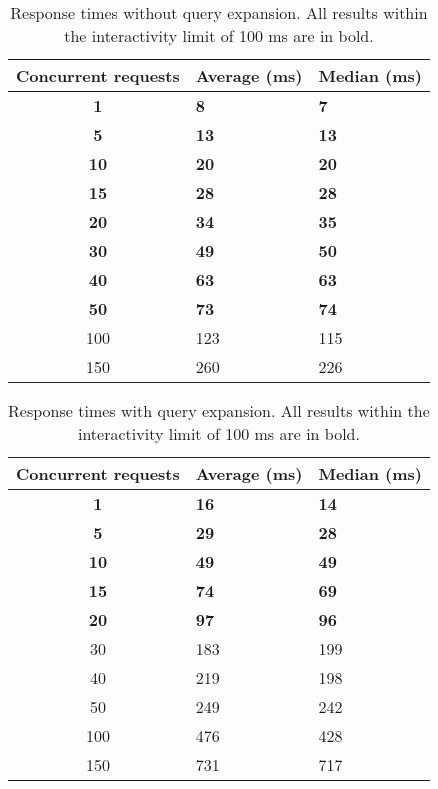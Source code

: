 \begin{table}[h]
    \centering
    \begin{tabular}{|c|l|l|}
    \hline
    \textbf{Concurrent requests} & \textbf{Average (ms)} & \textbf{Median (ms)} \\ \hline
    \textbf{1}          & \textbf{8}   & \textbf{7}           \\ \hline
    \textbf{5}          & \textbf{13}  & \textbf{13}          \\ \hline
    \textbf{10}         & \textbf{20}  & \textbf{20}          \\ \hline
    \textbf{15}         & \textbf{28}  & \textbf{28}          \\ \hline
    \textbf{20}         & \textbf{34}  & \textbf{35}          \\ \hline
    \textbf{30}         & \textbf{49}  & \textbf{50}          \\ \hline
    \textbf{40}         & \textbf{63}  & \textbf{63}          \\ \hline
    \textbf{50}         & \textbf{73}  & \textbf{74} \\ \hline
    100                 & 123          & 115         \\ \hline
    150                 & 260          & 226         \\ \hline
    \end{tabular}
    \caption{Response times without query expansion. All results within the interactivity limit of 100 ms are in bold.}
    \label{tbl:baseline}
\end{table}

\begin{table}[h]
    \centering
    \begin{tabular}{|c|l|l|}
    \hline
    \textbf{Concurrent requests} & \textbf{Average (ms)} & \textbf{Median (ms)} \\ \hline
    \textbf{1}           & \textbf{16}  & \textbf{14} \\ \hline
    \textbf{5}           & \textbf{29}  & \textbf{28} \\ \hline
    \textbf{10}          & \textbf{49}  & \textbf{49} \\ \hline
    \textbf{15}          & \textbf{74}  & \textbf{69} \\ \hline
    \textbf{20}          & \textbf{97}  & \textbf{96} \\ \hline
    30                   & 183          & 199         \\ \hline
    40                   & 219          & 198         \\ \hline
    50                   & 249          & 242         \\ \hline
    100                  & 476          & 428         \\ \hline
    150                  & 731          & 717         \\ \hline
    \end{tabular}
    \caption{Response times with query expansion. All results within the interactivity limit of 100 ms are in bold.}
    \label{tbl:query-expansion}
\end{table}

